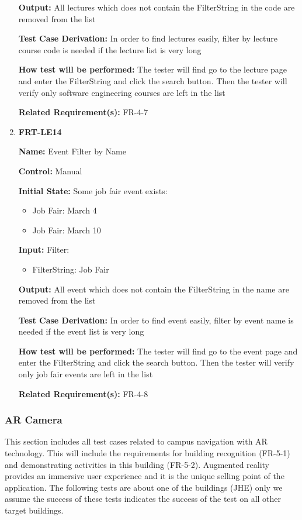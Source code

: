 \documentclass[12pt, titlepage]{article}
\begin{document}
\begin{enumerate}
\textbf{Output:} All lectures which does not contain the FilterString in the code are removed from the list

\textbf{Test Case Derivation:} In order to find lectures easily, filter by lecture course code is needed if the lecture list is very long
					
\textbf{How test will be performed:} The tester will find go to the lecture page and enter the FilterString and click the search button. Then the tester will verify only software engineering courses are left in the list

\textbf{Related Requirement(s):} FR-4-7

\item{\textbf{FRT-LE14}}

\textbf{Name:} Event Filter by Name

\textbf{Control:} Manual
					
\textbf{Initial State:} Some job fair event exists:
\begin{itemize}
\item Job Fair: March 4
\item Job Fair: March 10
\end{itemize}

\textbf{Input:} Filter:
\begin{itemize}
\item FilterString: Job Fair
\end{itemize}
					
\textbf{Output:} All event which does not contain the FilterString in the name are removed from the list

\textbf{Test Case Derivation:} In order to find event easily, filter by event name is needed if the event list is very long
					
\textbf{How test will be performed:} The tester will find go to the event page and enter the FilterString and click the search button. Then the tester will verify only job fair events are left in the list

\textbf{Related Requirement(s):} FR-4-8
\end{enumerate}

\subsubsection{AR Camera}

This section includes all test cases related to campus navigation with AR technology. This will include the requirements for building recognition (FR-5-1) and demonstrating activities in this building (FR-5-2). Augmented reality provides an immersive user experience and it is the unique selling point of the application. The following tests are about one of the buildings (JHE) only we assume the success of these tests indicates the success of the test on all other target buildings.
\end{document}
